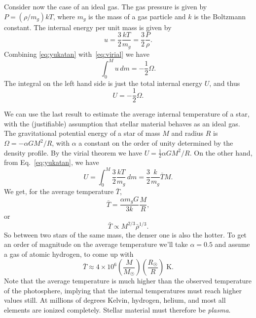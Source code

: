 \documentclass[]{article}
\newcommand{\unit}[1]{\;\mathrm{#1}}
\newcommand{\Sun}{\astrosun}
\begin{document}
Consider now the case of an ideal gas. The gas pressure is given by
$P = (\rho/m_g)kT$, where $m_g$ is the mass of a gas particle and $k$ is the
Boltzmann constant. The internal energy per unit mass is given by
\begin{equation}\label{eq:yukatan}
u = \frac{3}{2}\frac{kT}{m_g} = \frac{3}{2}\frac{P}{\rho}.
\end{equation}
Combining \eqref{eq:yukatan} with~\eqref{eq:virial} we have
\begin{equation}
\int_0^Mu\,dm = -\frac{1}{2}\Omega.
\end{equation}
The integral on the left hand side is just the total internal energy $U$, and
thus
\begin{equation}
U = -\frac{1}{2}\Omega.
\end{equation}

We can use the last result to estimate the average internal temperature of a
star, with the (justifiable) assumption that stellar material behaves as an
ideal gas. The gravitational potential energy of a star of mass $M$ and radius
$R$ is $\Omega = -\alpha{G}M^2/R$, with $\alpha$ a constant on the order of
unity determined by the density profile. By the virial theorem we have
$U = \frac{1}{2}\alpha{G}M^2/R$. On the other hand, from Eq.~\eqref{eq:yukatan},
we have
\begin{equation}
U = \int_0^M\frac{3}{2}\frac{kT}{m_g}\,dm=\frac{3}{2}\frac{k}{m_g}\bar{T}M.
\end{equation}
We get, for the average temperature $\bar{T}$,
\begin{equation}\label{eq:tibar}
\bar{T} = \frac{\alpha{m}_gG}{3k}\frac{M}{R},
\end{equation}
or
\begin{equation}
\bar{T}\propto{M}^{2/3}\bar{\rho}^{1/3}.
\end{equation}
So between two stars of the same mass, the denser one is also the hotter. To get
an order of magnitude on the average temperature we'll take $\alpha=0.5$ and
assume a gas of atomic hydrogen, to come up with
\begin{equation}
\bar{T} \approx 4\times10^6\left(\frac{M}{M_{\Sun}}\right)\left(\frac{R_{\Sun}}
{R}\right)\unit{K}.
\end{equation}
Note that the average temperature is much higher than the observed temperature
of the photosphere, implying that the internal temperatures must reach higher
values still. At millions of degrees Kelvin, hydrogen, helium, and most all
elements are ionized completely. Stellar material must therefore be
\emph{plasma}.
\end{document}
